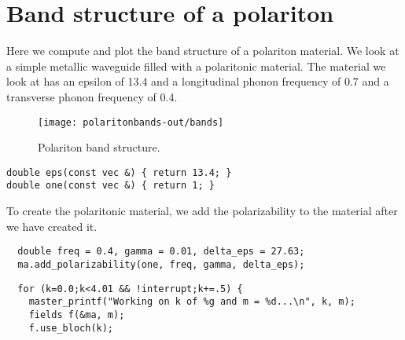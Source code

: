 \section{Band structure of a polariton}

\begin{comment}
#include <stdio.h>
#include <stdlib.h>

#include "meep.h"

const double rmax = 1.0;
\end{comment}

Here we compute and plot the band structure of a polariton material.  We
look at a simple metallic waveguide filled with a polaritonic material.
The material we look at has an epsilon of 13.4 and a longitudinal phonon
frequency of 0.7 and a transverse phonon frequency of 0.4.

\begin{figure}
\label{polaritonbands}
\caption{Polariton band structure.}
\texttt{[image: polaritonbands-out/bands]}
\end{figure}

\begin{verbatim}
double eps(const vec &) { return 13.4; }
double one(const vec &) { return 1; }
\end{verbatim}

\begin{comment}
int main(int argc, char **argv) {
  initialize mpi(argc, argv);
  deal_with_ctrl_c();
  const int a = 10;
  const int m = 0;
  double k;
  const double ttot = 1000;  
\end{comment}

\begin{comment}
  mat ma(volcyl(rmax, 0.0, a), eps);
  const char *dirname = make_output_directory(argv[0]);
  ma.set_output_directory(dirname);
  grace g("bands", dirname);
  g.set_range(0.0, 4.0, 0.0, 1.1);
\end{comment}

To create the polaritonic material, we add the polarizability to the
material after we have created it.

\begin{verbatim}
  double freq = 0.4, gamma = 0.01, delta_eps = 27.63;
  ma.add_polarizability(one, freq, gamma, delta_eps);
\end{verbatim}

\begin{verbatim}
  for (k=0.0;k<4.01 && !interrupt;k+=.5) {
    master_printf("Working on k of %g and m = %d...\n", k, m);
    fields f(&ma, m);
    f.use_bloch(k);
\end{verbatim}


